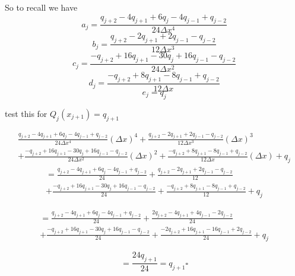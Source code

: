 \documentclass[12pt]{article}
\begin{document}
So to recall we have 
\[a_j = \frac{q_{j+2} -4q_{j+1} + 6q_j -4q_{j-1}  + q_{j-2}}{24 \Delta x^4 }\]
\[b_j = \frac{q_{j+2} - 2q_{j+1} + 2q_{j-1} - q_{j-2}}{12 \Delta x^3 }\]
\[c_j = \frac{-q_{j+2} +16q_{j+1} - 30q_j + 16q_{j-1}  - q_{j-2}}{24 \Delta x^2 }\]
\[d_j = \frac{-q_{j+2} + 8q_{j+1} - 8q_{j-1} + q_{j-2}}{12\Delta x}\]
\[e_j = q_j\]

test this for  $Q_j(x_{j+1}) = q_{j+1}$

\begin{equation*}
\begin{split}
\frac{q_{j+2} -4q_{j+1} + 6q_j -4q_{j-1}  + q_{j-2}}{24 \Delta x^4 }(\Delta x)^4 + \frac{q_{j+2} - 2q_{j+1} + 2q_{j-1} - q_{j-2}}{12 \Delta x^3 }(\Delta x)^3  \\ + \frac{-q_{j+2} +16q_{j+1} - 30q_j + 16q_{j-1}  - q_{j-2}}{24 \Delta x^2 }(\Delta x)^2 + \frac{-q_{j+2} + 8q_{j+1} - 8q_{j-1} + q_{j-2}}{12\Delta x}(\Delta x) + q_j
\end{split}
\end{equation*}
\begin{equation*}
\begin{split}
=\frac{q_{j+2} -4q_{j+1} + 6q_j -4q_{j-1}  + q_{j-2}}{24} + \frac{q_{j+2} - 2q_{j+1} + 2q_{j-1} - q_{j-2}}{12} \\ + \frac{-q_{j+2} +16q_{j+1} - 30q_j + 16q_{j-1}  - q_{j-2}}{24} + \frac{-q_{j+2} + 8q_{j+1} - 8q_{j-1} + q_{j-2}}{12} + q_j
\end{split}
\end{equation*}

\begin{equation*}
\begin{split}
=\frac{q_{j+2} -4q_{j+1} + 6q_j -4q_{j-1}  + q_{j-2}}{24} + \frac{2q_{j+2} - 4q_{j+1} + 4q_{j-1} - 2q_{j-2}}{24} \\ + \frac{-q_{j+2} +16q_{j+1} - 30q_j + 16q_{j-1}  - q_{j-2}}{24} + \frac{-2q_{j+2} + 16q_{j+1} - 16q_{j-1} + 2q_{j-2}}{24} + q_j
\end{split}
\end{equation*}

\begin{equation*}
=\frac{24q_{j+1}}{24} = q_{j+1} \square
\end{equation*}
\end{document}
